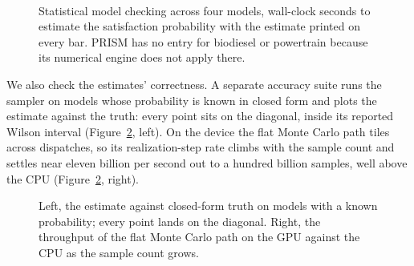 \begin{figure}[H]
\centering
\begin{minipage}{0.49\linewidth}\centering{}\end{minipage}\hfill
\begin{minipage}{0.49\linewidth}\centering{}\end{minipage}\\[6pt]
\begin{minipage}{0.49\linewidth}\centering{}\end{minipage}\hfill
\begin{minipage}{0.49\linewidth}\centering{}\end{minipage}
\caption{Statistical model checking across four models, wall-clock seconds to estimate the satisfaction probability with the estimate printed on every bar. PRISM has no entry for biodiesel or powertrain because its numerical engine does not apply there.}
\label{fig:smc-models}
\end{figure}

We also check the estimates' correctness. A separate accuracy suite runs the sampler on models whose probability is known in closed form and plots the estimate against the truth: every point sits on the diagonal, inside its reported Wilson interval (Figure~\ref{fig:smc-detail}, left). On the device the flat Monte Carlo path tiles across dispatches, so its realization-step rate climbs with the sample count and settles near eleven billion per second out to a hundred billion samples, well above the CPU (Figure~\ref{fig:smc-detail}, right).

\begin{figure}[H]
\centering
\begin{minipage}{0.49\linewidth}\centering{}\end{minipage}\hfill
\begin{minipage}{0.49\linewidth}\centering{}\end{minipage}
\caption{Left, the estimate against closed-form truth on models with a known probability; every point lands on the diagonal. Right, the throughput of the flat Monte Carlo path on the GPU against the CPU as the sample count grows.}
\label{fig:smc-detail}
\end{figure}

